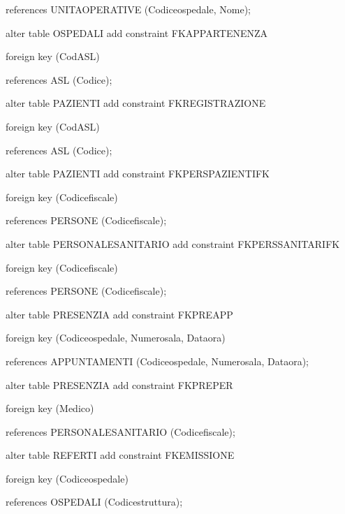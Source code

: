 \documentclass[a4paper,12pt]{report}
\begin{document}
     references UNITA\textunderscore OPERATIVE (Codice\textunderscore ospedale, Nome); \newline

\noindent alter table OSPEDALI add constraint FKAPPARTENENZA

     foreign key (Cod\textunderscore ASL)

     references ASL (Codice); \newline

\noindent alter table PAZIENTI add constraint FKREGISTRAZIONE

     foreign key (Cod\textunderscore ASL)

     references ASL (Codice); \newline

\noindent alter table PAZIENTI add constraint FKPERS\textunderscore PAZIENTI\textunderscore FK

     foreign key (Codice\textunderscore fiscale)

     references PERSONE (Codice\textunderscore fiscale); \newline 

\noindent alter table PERSONALE\textunderscore SANITARIO add constraint FKPERS\textunderscore SANITARI\textunderscore FK

     foreign key (Codice\textunderscore fiscale)

     references PERSONE (Codice\textunderscore fiscale); \newline

\noindent alter table PRESENZIA add constraint FKPRE\textunderscore APP

     foreign key (Codice\textunderscore ospedale, Numero\textunderscore sala, Data\textunderscore ora)

     references APPUNTAMENTI (Codice\textunderscore ospedale, Numero\textunderscore sala, Data\textunderscore ora); \newline

\noindent alter table PRESENZIA add constraint FKPRE\textunderscore PER

     foreign key (Medico)

     references PERSONALE\textunderscore SANITARIO (Codice\textunderscore fiscale); \newline

\noindent alter table REFERTI add constraint FKEMISSIONE

     foreign key (Codice\textunderscore ospedale)

     references OSPEDALI (Codice\textunderscore struttura); \newline
\end{document}
